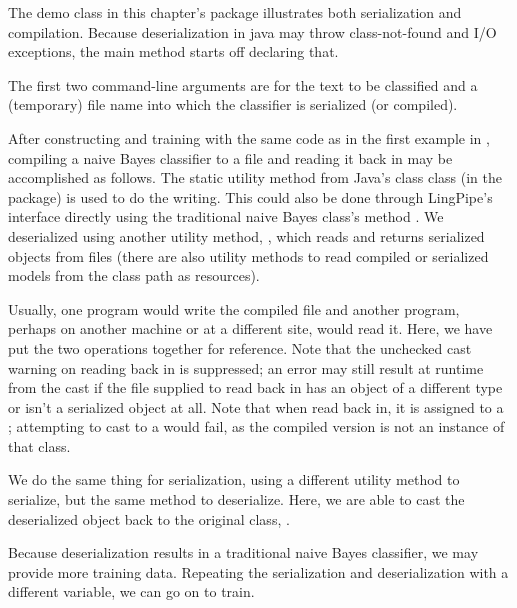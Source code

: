 The demo class  in this chapter's package
illustrates both serialization and compilation.  Because
deserialization in java may throw class-not-found and I/O exceptions,
the main method starts off declaring that.
%

The first two command-line arguments are for the text to be classified
and a (temporary) file name into which the classifier is serialized
(or compiled).

After constructing and training with the same code as in the first
example in , compiling a naive Bayes
classifier to a file and reading it back in may be accomplished as
follows.
%
%
The static utility method  from Java's class
 class (in the  package) is
used to do the writing.  This could also be done through LingPipe's
 interface directly using the traditional naive Bayes
class's method .  We deserialized using
another utility method, , which reads and returns
serialized objects from files (there are also utility methods to read
compiled or serialized models from the class path as resources).

Usually, one program would write the compiled file and another
program, perhaps on another machine or at a different site, would read
it.  Here, we have put the two operations together for reference.
Note that the unchecked cast warning on reading back in is suppressed;
an error may still result at runtime from the cast if the file
supplied to read back in has an object of a different type or isn't a
serialized object at all. Note that when read back in, it is
assigned to a ; attempting to
cast to a  would fail, as the compiled
version is not an instance of that class.

We do the same thing for serialization, using a different utility method
to serialize, but the same  method to deserialize. 
%
%
Here, we are able to cast the deserialized object back to the original
class, .  

Because deserialization results in a traditional naive Bayes
classifier, we may provide more training data.  Repeating the
serialization and deserialization with a different variable,
we can go on to train.
%



